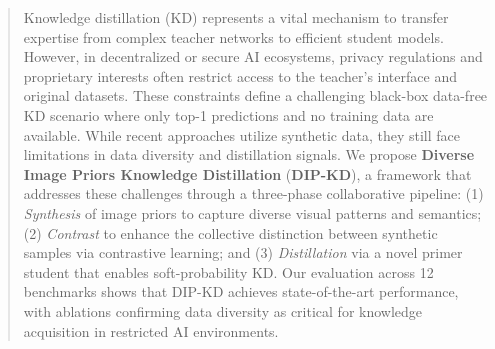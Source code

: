 \begin{abstract} \label{sec:00-abstract}
  Knowledge distillation (KD) represents a vital mechanism to transfer expertise from complex teacher networks to efficient student models.
  However, in decentralized or secure AI ecosystems, privacy regulations and proprietary interests often restrict access to the teacher's interface and original datasets.
  These constraints define a challenging black-box data-free KD scenario where only top-1 predictions and no training data are available.
  While recent approaches utilize synthetic data, they still face limitations in data diversity and distillation signals.
  We propose \textbf{Diverse Image Priors Knowledge Distillation} (\textbf{DIP-KD}), a framework that addresses these challenges through a three-phase collaborative pipeline: (1) \textit{Synthesis} of image priors to capture diverse visual patterns and semantics; (2) \textit{Contrast} to enhance the collective distinction between synthetic samples via contrastive learning; and (3) \textit{Distillation} via a novel primer student that enables soft-probability KD.
  Our evaluation across 12 benchmarks shows that DIP-KD achieves state-of-the-art performance, with ablations confirming data diversity as critical for knowledge acquisition in restricted AI environments.

\end{abstract}
